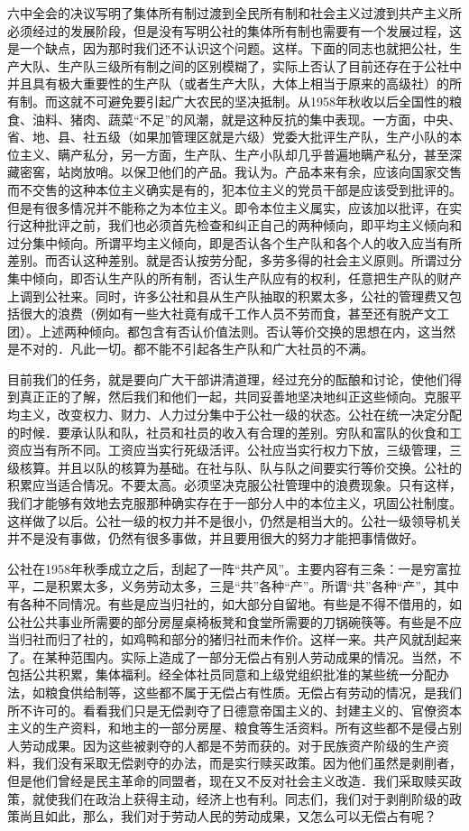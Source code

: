 六中全会的决议写明了集体所有制过渡到全民所有制和社会主义过渡到共产主义所必须经过的发展阶段，但是没有写明公社的集体所有制也需要有一个发展过程，这是一个缺点，因为那时我们还不认识这个问题。这样。下面的同志也就把公社，生产大队、生产队三级所有制之间的区别模糊了，实际上否认了目前还存在于公社中并且具有极大重要性的生产队（或者生产大队，大体上相当于原来的高级社）的所有制。而这就不可避免要引起广大农民的坚决抵制。从1958年秋收以后全国性的粮食、油料、猪肉、蔬菜“不足”的风潮，就是这种反抗的集中表现。一方面，中央、省、地、县、社五级（如果加管理区就是六级）党委大批评生产队，生产小队的本位主义、瞒产私分，另一方面，生产队、生产小队却几乎普遍地瞒产私分，甚至深藏密窖，站岗放哨。以保卫他们的产品。我认为。产品本来有余，应该向国家交售而不交售的这种本位主义确实是有的，犯本位主义的党员干部是应该受到批评的。但是有很多情况并不能称之为本位主义。即令本位主义属实，应该加以批评，在实行这种批评之前，我们也必须首先检查和纠正自己的两种倾向，即平均主义倾向和过分集中倾向。所谓平均主义倾向，即是否认各个生产队和各个人的收入应当有所差别。而否认这种差别。就是否认按劳分配，多劳多得的社会主义原则。所谓过分集中倾向，即否认生产队的所有制，否认生产队应有的权利，任意把生产队的财产上调到公社来。同时，许多公社和县从生产队抽取的积累太多，公社的管理费又包括很大的浪费（例如有一些大社竟有成千工作人员不劳而食，甚至还有脱产文工团）。上述两种倾向。都包含有否认价值法则。否认等价交换的思想在内，这当然是不对的．凡此一切。都不能不引起各生产队和广大社员的不满。

目前我们的任务，就是要向广大干部讲清道理，经过充分的酝酿和讨论，使他们得到真正正的了解，然后我们和他们一起，共同妥善地坚决地纠正这些倾向。克服平均主义，改变权力、财力、人力过分集中于公社一级的状态。公社在统一决定分配的时候．要承认队和队，社员和社员的收入有合理的差别。穷队和富队的伙食和工资应当有所不同。工资应当实行死级活评。公社应当实行权力下放，三级管理，三级核算。并且以队的核算为基础。在社与队、队与队之间要实行等价交换。公社的积累应当适合情况。不要太高。必须坚决克服公社管理中的浪费现象。只有这样，我们才能够有效地去克服那种确实存在于一部分人中的本位主义，巩固公社制度。这样做了以后。公社一级的权力并不是很小，仍然是相当大的。公社一级领导机关并不是没有事做，仍然有很多事做，并且要用很大的努力才能把事情做好。

公社在1958年秋季成立之后，刮起了一阵“共产风”。主要内容有三条：一是穷富拉平，二是积累太多，义务劳动太多，三是“共”各种“产”。所谓“共”各种“产”，其中有各种不同情况。有些是应当归社的，如大部分自留地。有些是不得不借用的，如公社公共事业所需要的部分房屋桌椅板凳和食堂所需要的刀锅碗筷等。有些是不应当归社而归了社的，如鸡鸭和部分的猪归社而未作价。这样一来。共产风就刮起来了。在某种范围内。实际上造成了一部分无偿占有别人劳动成果的情况。当然，不包括公共积累，集体福利。经全体社员同意和上级党组织批准的某些统一分配办法，如粮食供给制等，这些都不属于无偿占有性质。无偿占有劳动的情况，是我们所不许可的。看看我们只是无偿剥夺了日德意帝国主义的、封建主义的、官僚资本主义的生产资料，和地主的一部分房屋、粮食等生活资料。所有这些都不是侵占别人劳动成果。因为这些被剥夺的人都是不劳而获的。对于民族资产阶级的生产资料，我们没有采取无偿剥夺的办法，而是实行赎买政策。因为他们虽然是剥削者，但是他们曾经是民主革命的同盟者，现在又不反对社会主义改造．我们采取赎买政策，就使我们在政治上获得主动，经济上也有利。同志们，我们对于剥削阶级的政策尚且如此，那么，我们对于劳动人民的劳动成果，又怎么可以无偿占有呢？

